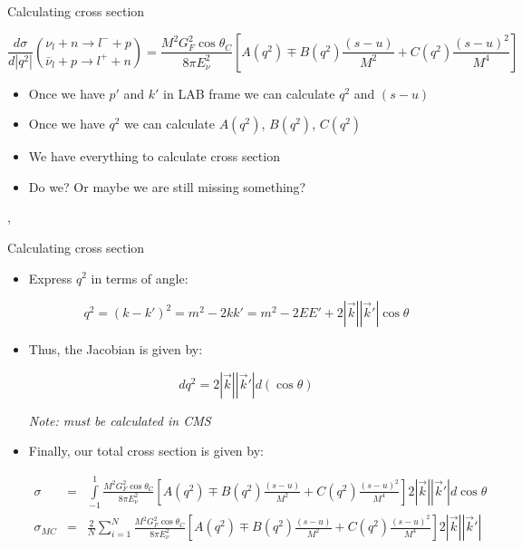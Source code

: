 \begin{wideslide}[toc=]{Calculating cross section}
\null\vfill

  
  $$\frac{d\sigma}{d|q^2|} {{\nu_l + n \rightarrow l^- + p}\choose{\bar\nu_l + p \rightarrow l^+ + n}} = \frac{M^2G_F^2\cos\theta_C}{8\pi E_\nu^2}\left[A(q^2) \mp B(q^2)\frac{(s - u)}{M^2} + C(q^2)\frac{(s - u)^2}{M^4}\right]$$
  

  \begin{itemize}
    \item Once we have $p'$ and $k'$ in LAB frame we can calculate $q^2$ and $(s - u)$
    \item Once we have $q^2$ we can calculate $A(q^2)$, $B(q^2)$, $C(q^2)$
    \item We have everything to calculate cross section
    \item Do we? Or maybe we are still missing something?
  \end{itemize}
  \sep

\vfill\null
\end{wideslide}

\begin{wideslide}[toc=]{Calculating cross section}
\null\vfill

  \begin{itemize}
    
    \item Express $q^2$ in terms of angle:
    
    $$q^2 = (k - k')^2 = m^2 - 2kk' = m^2 - 2EE' + 2|\vec k||\vec k'|\cos\theta $$
    
    \item Thus, the Jacobian is given by:
    
    $$dq^2 = 2|\vec k||\vec k'|d(\cos\theta)$$
    
    {\it\color{pdcolor3}Note: must be calculated in CMS}
    
    \item Finally, our total cross section is given by:
    
    \begin{eqnarray*}
      \sigma      & = & \int\limits_{-1}^{1} \frac{M^2G_F^2\cos\theta_C}{8\pi E_\nu^2}\left[A(q^2) \mp B(q^2)\frac{(s - u)}{M^2} + C(q^2)\frac{(s - u)^2}{M^4}\right]2|\vec k||\vec k'|d\cos\theta \\
      \sigma_{MC} & = & \frac{2}{N}\sum\limits_{i = 1}^N \frac{M^2G_F^2\cos\theta_C}{8\pi E_\nu^2}\left[A(q^2) \mp B(q^2)\frac{(s - u)}{M^2} + C(q^2)\frac{(s - u)^2}{M^4}\right]2|\vec k||\vec k'|
    \end{eqnarray*}

  \end{itemize}

\vfill\null
\end{wideslide}

